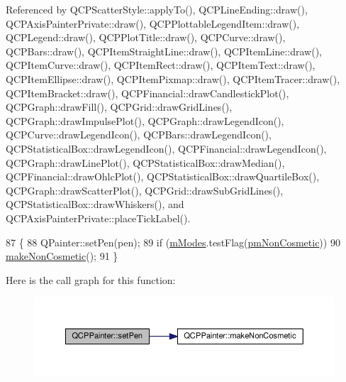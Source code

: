 Referenced by Q\+C\+P\+Scatter\+Style\+::apply\+To(), Q\+C\+P\+Line\+Ending\+::draw(), Q\+C\+P\+Axis\+Painter\+Private\+::draw(), Q\+C\+P\+Plottable\+Legend\+Item\+::draw(), Q\+C\+P\+Legend\+::draw(), Q\+C\+P\+Plot\+Title\+::draw(), Q\+C\+P\+Curve\+::draw(), Q\+C\+P\+Bars\+::draw(), Q\+C\+P\+Item\+Straight\+Line\+::draw(), Q\+C\+P\+Item\+Line\+::draw(), Q\+C\+P\+Item\+Curve\+::draw(), Q\+C\+P\+Item\+Rect\+::draw(), Q\+C\+P\+Item\+Text\+::draw(), Q\+C\+P\+Item\+Ellipse\+::draw(), Q\+C\+P\+Item\+Pixmap\+::draw(), Q\+C\+P\+Item\+Tracer\+::draw(), Q\+C\+P\+Item\+Bracket\+::draw(), Q\+C\+P\+Financial\+::draw\+Candlestick\+Plot(), Q\+C\+P\+Graph\+::draw\+Fill(), Q\+C\+P\+Grid\+::draw\+Grid\+Lines(), Q\+C\+P\+Graph\+::draw\+Impulse\+Plot(), Q\+C\+P\+Graph\+::draw\+Legend\+Icon(), Q\+C\+P\+Curve\+::draw\+Legend\+Icon(), Q\+C\+P\+Bars\+::draw\+Legend\+Icon(), Q\+C\+P\+Statistical\+Box\+::draw\+Legend\+Icon(), Q\+C\+P\+Financial\+::draw\+Legend\+Icon(), Q\+C\+P\+Graph\+::draw\+Line\+Plot(), Q\+C\+P\+Statistical\+Box\+::draw\+Median(), Q\+C\+P\+Financial\+::draw\+Ohlc\+Plot(), Q\+C\+P\+Statistical\+Box\+::draw\+Quartile\+Box(), Q\+C\+P\+Graph\+::draw\+Scatter\+Plot(), Q\+C\+P\+Grid\+::draw\+Sub\+Grid\+Lines(), Q\+C\+P\+Statistical\+Box\+::draw\+Whiskers(), and Q\+C\+P\+Axis\+Painter\+Private\+::place\+Tick\+Label().


\begin{DoxyCode}
87 \{
88   QPainter::setPen(pen);
89   \textcolor{keywordflow}{if} (\hyperlink{class_q_c_p_painter_af5d1d6e5df0adbc7de5633250fb3396c}{mModes}.testFlag(\hyperlink{class_q_c_p_painter_a156cf16444ff5e0d81a73c615fdb156dac1e481bfaf408f2bd2eaad3ec341f36b}{pmNonCosmetic}))
90     \hyperlink{class_q_c_p_painter_a7e63fbcf47e35c6f2ecd11b8fef7c7d8}{makeNonCosmetic}();
91 \}
\end{DoxyCode}


Here is the call graph for this function\+:\nopagebreak
\begin{figure}[H]
\begin{center}
\leavevmode
\includegraphics[width=350pt]{class_q_c_p_painter_af9c7a4cd1791403901f8c5b82a150195_cgraph}
\end{center}
\end{figure}




